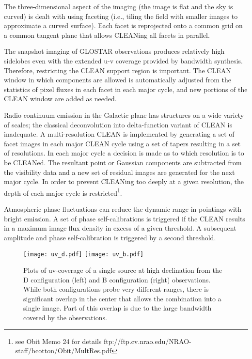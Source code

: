 \documentclass{aa}
\begin{document}
The three-dimensional aspect of the imaging (the image is flat and the sky is curved) is dealt with using faceting (i.e., tiling the field with smaller images to approximate a curved surface). Each facet is reprojected onto a common grid on a common tangent plane that allows CLEANing all facets in parallel.

The snapshot imaging of GLOSTAR observations produces relatively high sidelobes even with the extended u-v coverage provided by bandwidth synthesis. Therefore, restricting the CLEAN support region is important. The CLEAN window in which components are allowed is automatically adjusted from the statistics of pixel fluxes in each facet in each major cycle, and new portions of the CLEAN window are added as needed.

Radio continuum emission in the Galactic plane has structures on a wide variety of scales; the classical deconvolution into delta-function variant of CLEAN is inadequate. A multi-resolution CLEAN is implemented by generating a set of facet images in each major CLEAN cycle using a set of tapers resulting in a set of resolutions. In each major cycle a decision is made as to which resolution is to be CLEANed. The resultant point or Gaussian components are subtracted from the visibility data and a new set of residual images are generated for the next major cycle. In order to prevent CLEANing too deeply at a given resolution, the depth of each major cycle is restricted\footnote{see Obit Memo 24 for details ftp://ftp.cv.nrao.edu/NRAO-staff/bcotton/Obit/MultRes.pdf}.

Atmospheric phase fluctuations can reduce the dynamic range in pointings with bright emission. A set of phase self-calibrations is triggered if the CLEAN results in a maximum image flux density in excess of a given threshold. A subsequent amplitude and phase self-calibration is triggered by a second threshold.

\begin{figure*}
  \texttt{[image: uv\_d.pdf]}
  \texttt{[image: uv\_b.pdf]}
  \caption{Plots of uv-coverage of a single source at high declination from the D configuration (left) and B configuration (right) observations. While both configurations probe very different ranges, there is significant overlap in the center that allows the combination into a single image. Part of this overlap is due to the large bandwidth covered by the observations.}
  \label{fig:uv-cov}
\end{figure*}
\end{document}
